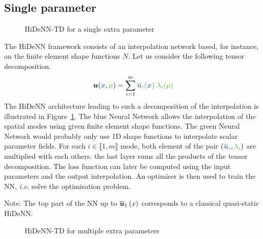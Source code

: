 \subsection{Single parameter}
\begin{figure}
\vspace{-65pt}
    \flushleft
    
    \caption{HiDeNN-TD for a single extra parameter}
    \label{fig:HiDeNN_TD_mu}
\end{figure}
The HiDeNN framework consists of an interpolation network based, for instance, on the finite element shape functions $N$. Let us consider the following tensor decomposition.
\begin{equation}
    \vect{u}(\textcolor{BleuLMS!70}{\vect{x}},\textcolor{LGreenLMS}{\mu}) = \sum\limits_{i=1}^m \textcolor{BleuLMS!70}{\overline{\vect{u}}_i(\vect{x})} ~\textcolor{LGreenLMS}{\lambda_i(\mu)}
\end{equation}
The HiDeNN architecture leading to such a decomposition of the interpolation is illustrated in Figure~\ref{fig:HiDeNN_TD_mu}. The \textcolor{BleuLMS!70}{blue Neural Network} allows the interpolation of the spatial modes using given finite element shape functions. The \textcolor{LGreenLMS}{green Neural Network} would probably only use 1D shape functions to interpolate scalar parameter fields. For each $i \in \llbracket 1, m \rrbracket$ mode, both element of the pair $\left(\textcolor{BleuLMS!70}{\vect{\overline{u}}_i}, \textcolor{LGreenLMS}{\lambda_i} \right)$ are multiplied with each others. the last layer sums all the products of the tensor decomposition. 
The loss function can later be computed using the input parameters and the output interpolation. An optimiser is then used to train the NN, \emph{i.e.} solve the optimisation problem. 

Note: The top part of the NN up to $\boldsymbol{\overline{u}}_1\left(x\right)$ corresponds to a classical quasi-static HiDeNN. 

\begin{figure}
    \flushright
    
    \caption{HiDeNN-TD for multiple extra parameters}
    \label{fig:HiDeNN_TD_multipleMu}
\end{figure}


